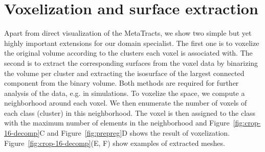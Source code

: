 \section {Voxelization and surface extraction}
\label{sec:vis}
Apart from direct visualization of the MetaTracts, we show two simple but yet highly important extensions for our domain specialist. The first one is to voxelize the original volume according to the clusters each voxel is associated with.
The second is to extract the corresponding surfaces from the voxel data by binarizing the volume per cluster and extracting the isosurface of the largest connected component from the binary volume. Both methods are required for further analysis of the data, e.g. in simulations.
To voxelize the space,  we compute a neighborhood around each voxel. We then enumerate the number of voxels of each class (cluster) in this neighborhood. The voxel is then assigned to the class with the maximum number of elements in the neighborhood and Figure~\ref{fig:crop-16-decomp}C and Figure~\ref{fig:prepreg}D shows the result of voxelization. Figure~\ref{fig:crop-16-decomp}(E, F) show examples of extracted meshes.
%
%
%
